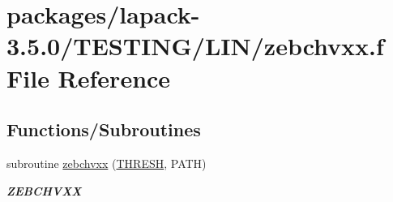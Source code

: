 \hypertarget{zebchvxx_8f}{}\section{packages/lapack-\/3.5.0/\+T\+E\+S\+T\+I\+N\+G/\+L\+I\+N/zebchvxx.f File Reference}
\label{zebchvxx_8f}
\subsection*{Functions/\+Subroutines}
\begin{DoxyCompactItemize}
\item 
subroutine \hyperlink{group__complex16__lin_ga3f3806a102b68ce47af8fee0c5fbf3a0}{zebchvxx} (\hyperlink{zlaqgs_8c_a0656018abfc9fa2821827415f5d5ea57}{T\+H\+R\+E\+S\+H}, P\+A\+T\+H)
\begin{DoxyCompactList}\small\item\em {\bfseries Z\+E\+B\+C\+H\+V\+X\+X} \end{DoxyCompactList}\end{DoxyCompactItemize}
